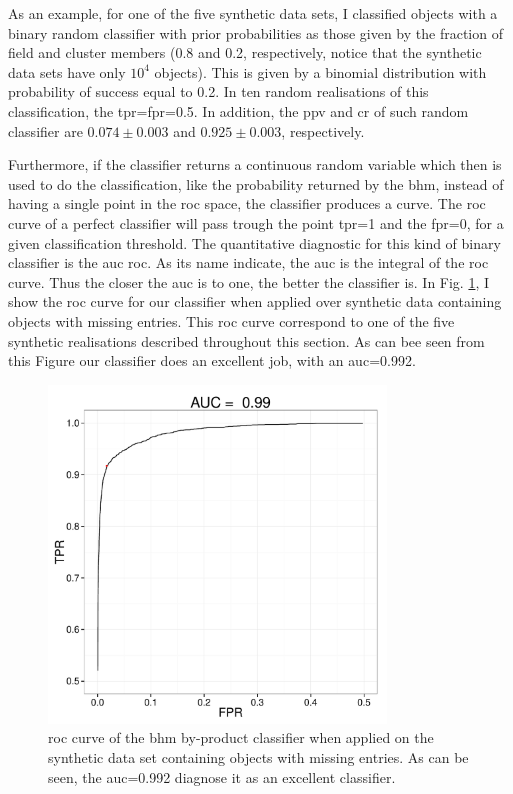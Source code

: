 As an example, for one of the five synthetic data sets,  I classified objects with a binary random classifier with prior probabilities as those given by the fraction of field and cluster members (0.8 and 0.2, respectively, notice that the synthetic data sets have only $10^4$ objects). This is given by a binomial distribution with probability of success equal to 0.2. In ten random realisations of this classification, the \gls{tpr}=\gls{fpr}=0.5. In addition, the \gls{ppv} and \gls{cr} of such random classifier are $0.074\pm 0.003$ and $0.925\pm0.003$, respectively.

Furthermore, if the classifier returns a continuous random variable which then is used to do the classification, like the probability returned by the \gls{bhm}, instead of having a single point in the \gls{roc} space, the classifier produces a curve. The \gls{roc} curve of a perfect classifier will pass trough the point \gls{tpr}=1 and the \gls{fpr}=0, for a given classification threshold. The quantitative diagnostic for this kind of binary classifier is the \gls{auc} \gls{roc}. As its name indicate, the \gls{auc} is the integral of the \gls{roc} curve. Thus the closer the \gls{auc} is to one, the better the classifier is. In Fig. \ref{fig:ROC}, I show the \gls{roc} curve for our classifier when applied over synthetic data containing objects with missing entries. This \gls{roc} curve correspond to one of the five synthetic realisations described throughout this section. As can bee seen from this Figure our classifier does an excellent job, with an \gls{auc}=0.992.

\begin{figure}[!htp]
\begin{center}
\includegraphics[page=1,width=0.8\textwidth]{background/Figures/ROC.pdf}
\caption{\gls{roc} curve of the \gls{bhm} by-product classifier when applied on the synthetic data set containing objects with missing entries. As can be seen, the \gls{auc}=0.992 diagnose it as an excellent classifier.}
\label{fig:ROC}
\end{center}
\end{figure}

